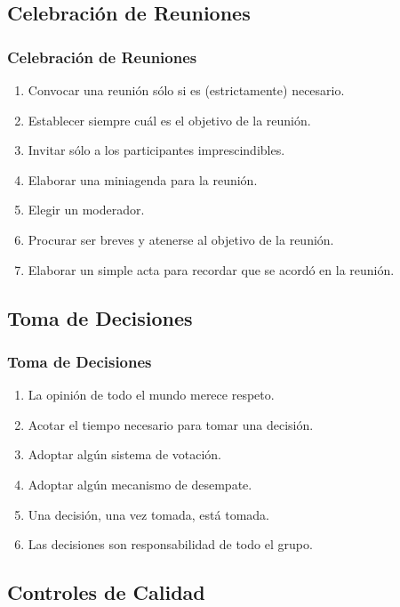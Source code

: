 \documentclass[handout,a4paper,t,xcolor=pst,dvips]{beamer}
\begin{document}
\subsection{Celebración de Reuniones}

\begin{frame}[c]
	\frametitle{Celebración de Reuniones}
	\begin{enumerate}[<+->]
		\item Convocar una reunión sólo si es (estrictamente) necesario.
		\item Establecer siempre cuál es el objetivo de la reunión.
		\item Invitar sólo a los participantes imprescindibles. 
		\item Elaborar una miniagenda para la reunión.
		\item Elegir un moderador.
		\item Procurar ser breves y atenerse al objetivo de la reunión.
		\item Elaborar un simple acta para recordar que se acordó en la reunión.
	\end{enumerate}
\end{frame}

\subsection{Toma de Decisiones}

\begin{frame}[c]
	\frametitle{Toma de Decisiones}
	\begin{enumerate}[<+->]
		\item La opinión de todo el mundo merece respeto.
		\item Acotar el tiempo necesario para tomar una decisión.
		\item Adoptar algún sistema de votación.
		\item Adoptar algún mecanismo de desempate.
		\item Una decisión, una vez tomada, está tomada.
		\item Las decisiones son responsabilidad de todo el grupo.
	\end{enumerate}
\end{frame}

\subsection{Controles de Calidad}
\end{document}
